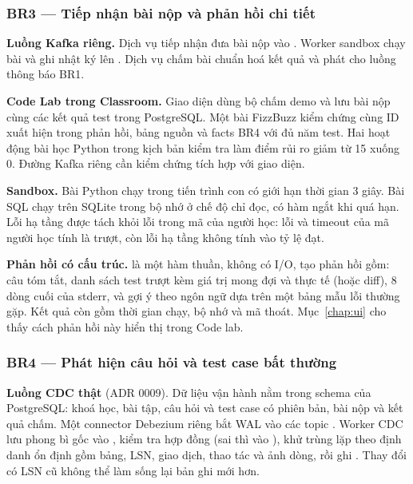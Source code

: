 \subsubsection{BR3 --- Tiếp nhận bài nộp và phản hồi chi tiết}

\textbf{Luồng Kafka riêng.} Dịch vụ tiếp nhận đưa bài nộp vào . Worker sandbox chạy bài và ghi nhật ký lên . Dịch vụ chấm bài chuẩn hoá kết quả và phát  cho luồng thông báo BR1.

\textbf{Code Lab trong Classroom.} Giao diện dùng bộ chấm demo và lưu bài nộp cùng các kết quả test trong PostgreSQL. Một bài FizzBuzz kiểm chứng cùng ID xuất hiện trong phản hồi, bảng nguồn và facts BR4 với đủ năm test. Hai hoạt động bài học Python trong kịch bản kiểm tra làm điểm rủi ro giảm từ 15 xuống 0. Đường Kafka riêng cần kiểm chứng tích hợp với giao diện.

\textbf{Sandbox.} Bài Python chạy trong tiến trình con có giới hạn thời gian 3 giây. Bài SQL chạy trên SQLite trong bộ nhớ ở chế độ chỉ đọc, có hàm ngắt khi quá hạn. Lỗi hạ tầng được tách khỏi lỗi trong mã của người học: lỗi và timeout của mã người học tính là trượt, còn lỗi hạ tầng không tính vào tỷ lệ đạt.

\textbf{Phản hồi có cấu trúc.}  là một hàm thuần, không có I/O, tạo phản hồi gồm: câu tóm tắt, danh sách test trượt kèm giá trị mong đợi và thực tế (hoặc diff), 8 dòng cuối của stderr, và gợi ý theo ngôn ngữ dựa trên một bảng mẫu lỗi thường gặp. Kết quả còn gồm thời gian chạy, bộ nhớ và mã thoát. Mục~\ref{chap:ui} cho thấy cách phản hồi này hiển thị trong Code lab.

\subsubsection{BR4 --- Phát hiện câu hỏi và test case bất thường}
\label{sec:br4-runtime}

\textbf{Luồng CDC thật} (ADR 0009). Dữ liệu vận hành nằm trong schema  của PostgreSQL: khoá học, bài tập, câu hỏi và test case có phiên bản, bài nộp và kết quả chấm. Một connector Debezium riêng bắt WAL vào các topic . Worker CDC lưu phong bì gốc vào , kiểm tra hợp đồng (sai thì vào ), khử trùng lặp theo định danh ổn định gồm bảng, LSN, giao dịch, thao tác và ảnh dòng, rồi ghi . Thay đổi có LSN cũ không thể làm sống lại bản ghi mới hơn.

